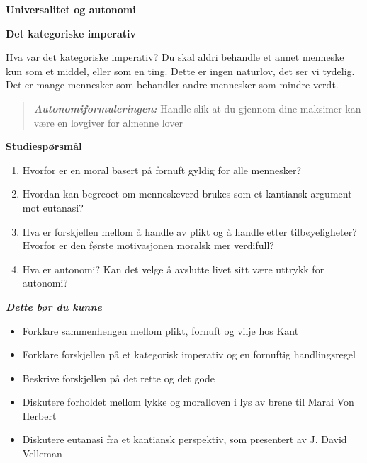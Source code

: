 \documentclass[11pt, a4paper]{article}
\newenvironment{sectionbox}[1][]{%
    \begin{sectionboxinner}
    \textbf{\large #1}
    \vspace{1pt}
    \newline
}{%
    \end{sectionboxinner}
}
\newenvironment{subsectionbox}[1][]{%
    \begin{subsectionboxinner}
    \textbf{#1}
    \vspace{3pt}
    \newline
}{%
    \end{subsectionboxinner}
}
\begin{document}
\begin{sectionbox}[Universalitet og autonomi]
    \begin{subsectionbox}[Det kategoriske imperativ]

        Hva var det kategoriske imperativ? Du skal aldri behandle et annet menneske kun som et middel, eller som en ting. Dette er ingen naturlov, det ser vi tydelig. Det er mange mennesker som behandler andre mennesker som mindre verdt.


        \begin{quote}
            \textbf{\textit{Autonomiformuleringen:}} Handle slik at du gjennom dine maksimer kan være en lovgiver for almenne lover
        \end{quote}
    \end{subsectionbox}
\end{sectionbox}


\begin{sectionbox}[Studiespørsmål]
\begin{enumerate}
    \item Hvorfor er en moral basert på fornuft gyldig for alle mennesker?
    \item Hvordan kan begreoet om menneskeverd brukes som et kantiansk argument mot eutanasi?
    \item Hva er forskjellen mellom å handle av plikt og å handle etter tilbøyeligheter? Hvorfor er den første motivasjonen moralsk mer verdifull?
    \item Hva er autonomi? Kan det velge å avslutte livet sitt være uttrykk for autonomi?
\end{enumerate}

\textbf{\textit{Dette bør du kunne}}
\begin{itemize}
    \item Forklare sammenhengen mellom plikt, fornuft og vilje hos Kant
    \item Forklare forskjellen på et kategorisk imperativ og en fornuftig handlingsregel
    \item Beskrive forskjellen på det rette og det gode
    \item Diskutere forholdet mellom lykke og moralloven i lys av brene til Marai Von Herbert
    \item Diskutere eutanasi fra et kantiansk perspektiv, som presentert av J. David Velleman
\end{itemize}
\end{sectionbox}
\end{document}
